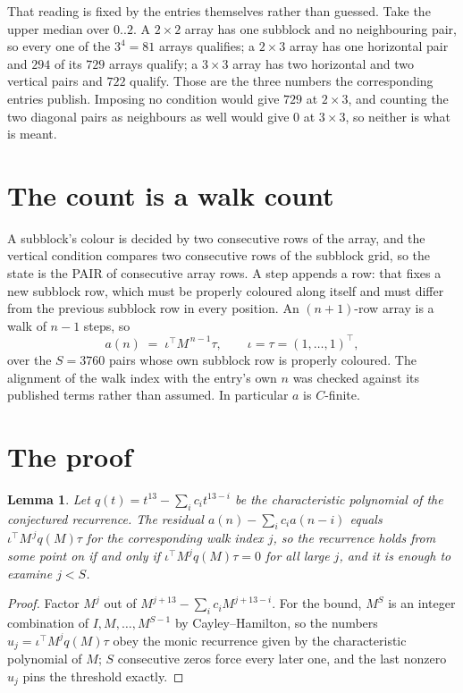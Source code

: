 \documentclass[11pt,a4paper]{article}
\theoremstyle{plain}
\newtheorem{lemma}[theorem]{Lemma}
\theoremstyle{definition}
\begin{document}
That reading is fixed by the entries themselves rather than guessed. Take the upper median
over $0..2$. A $2\times2$ array has one subblock and no neighbouring pair, so every one of the
$3^4=81$ arrays qualifies; a $2\times3$ array has one horizontal pair and $294$ of its $729$
arrays qualify; a $3\times3$ array has two horizontal and two vertical pairs and $722$
qualify. Those are the three numbers the corresponding entries publish. Imposing no condition
would give $729$ at $2\times3$, and counting the two diagonal pairs as neighbours as well
would give $0$ at $3\times3$, so neither is what is meant.

\section{The count is a walk count}

A subblock's colour is decided by two consecutive rows of the array, and
the vertical condition compares two consecutive rows of the subblock grid, so the state is the
PAIR of consecutive array rows. A step appends a row: that fixes a new subblock row, which
must be properly coloured along itself and must differ from the previous subblock row in every
position. An $(n+1)$-row array is a walk of $n-1$ steps, so
\[
a(n)\;=\;\iota^{\!\top}M^{\,n-1}\tau,\qquad\iota=\tau=(1,\dots,1)^{\!\top},
\]
over the $S=3760$ pairs whose own subblock row is properly coloured.
The alignment of the walk index with the entry's own $n$ was checked against its published
terms rather than assumed. In particular $a$ is $C$-finite.

\section{The proof}

\begin{lemma}\label{lem:crit}
Let $q(t)=t^{13}-\sum_i c_it^{13-i}$ be the characteristic polynomial of the
conjectured recurrence. The residual $a(n)-\sum_ic_ia(n-i)$ equals
$\iota^{\!\top}M^{\,j}q(M)\tau$ for the corresponding walk index $j$, so the recurrence
holds from some point on if and only if $\iota^{\!\top}M^{j}q(M)\tau=0$ for all large $j$,
and it is enough to examine $j<S$.
\end{lemma}

\begin{proof}
Factor $M^{j}$ out of $M^{j+13}-\sum_ic_iM^{j+13-i}$. For the bound, $M^{S}$
is an integer combination of $I,M,\dots,M^{S-1}$ by Cayley--Hamilton, so the numbers
$u_j=\iota^{\!\top}M^{j}q(M)\tau$ obey the monic recurrence given by the characteristic
polynomial of $M$; $S$ consecutive zeros force every later one, and the last nonzero $u_j$
pins the threshold exactly.
\end{proof}
\end{document}
